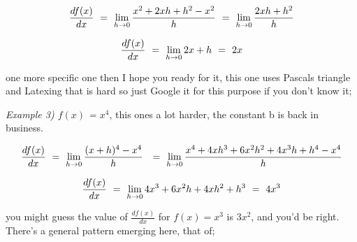 \documentclass{article}
\begin{document}
\begin{equation} \label{eq:310}
\frac{df(x)}{dx} \hspace{0.125cm} = \hspace{0.125cm} \lim_{h\to0} \frac{x^2 + 2xh + h^2 - x^2}{h} \hspace{0.125cm} = \hspace{0.125cm} \lim_{h\to0} \frac{2xh + h^2}{h} 
\end{equation}

\begin{equation} \label{eq:311}
\frac{df(x)}{dx} \hspace{0.125cm} = \hspace{0.125cm} \lim_{h\to0} 2x + h \hspace{0.125cm} = \hspace{0.125cm} 2x
\end{equation}

one more specific one then I hope you ready for it, this one uses Pascals triangle and Latexing that is hard so just Google it for this purpose if you don't know it;

\textit{Example 3)  \begin{math} f(x) \end{math} = \begin{math} x^4 \end{math}}, this ones a lot harder, the constant b is back in business.

\begin{equation} \label{eq:312}
\frac{df(x)}{dx} \hspace{0.125cm} = \hspace{0.125cm} \lim_{h\to0} \frac{(x + h)^4- x^4}{h} \hspace{0.125cm} \hspace{0.125cm} = \hspace{0.125cm} \lim_{h\to0} \frac{x^4 + 4x h^3 + 6 x^2 h^2 + 4 x^3 h + h^4 - x^4}{h} 
\end{equation}

\begin{equation} \label{eq:313}
\frac{df(x)}{dx} \hspace{0.125cm} = \hspace{0.125cm} \lim_{h\to0} 4 x^3 + 6 x^2 h + 4 x h^2 + h^3 \hspace{0.125cm} = \hspace{0.125cm} 4 x^3
\end{equation}

you might guess the value of \begin{math} \frac{df(x)}{dx} \end{math} for \begin{math} f(x) = x^3 \end{math} is \begin{math} 3 x^2  \end{math}, and you'd be right. There's a general pattern emerging here, that of;
\end{document}
